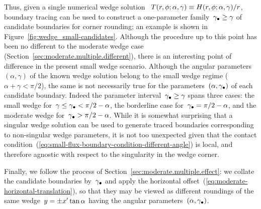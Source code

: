 \begin{figure}
\end{figure}

Thus, given a single numerical wedge solution~%
  $T (r, \phi; \alpha, \gamma) \equiv H (r, \phi; \alpha, \gamma) / r$,
boundary tracing can be used to construct
a one-parameter family~$\gamma_\bullet \ge \gamma$
of candidate boundaries for corner rounding;
an example is shown in Figure~\ref{fig:wedge_small-candidates}.
Although the procedure up to this point
has been no different to the moderate wedge case
(Section~\ref{sec:moderate.multiple.different}),
there is an interesting point of difference
in the present small wedge scenario.
Although the angular parameters~$(\alpha, \gamma)$
of the known wedge solution
belong to the small wedge regime ($\alpha + \gamma < \pi/2$),
the same is not necessarily true
for the parameters~$(\alpha, \gamma_\bullet)$
of each candidate boundary.
Indeed the parameter interval~$\gamma_\bullet \ge \gamma$ spans three cases:
the small wedge for~$\gamma \le \gamma_\bullet < \pi/2 - \alpha$,
the borderline case for~$\gamma_\bullet = \pi/2 - \alpha$,
and the moderate wedge for~$\gamma_\bullet > \pi/2 - \alpha$.
While it is somewhat surprising that a singular wedge solution
can be used to generate traced boundaries corresponding to
non-singular wedge parameters,
it is not too unexpected given that
the contact condition~(\ref{eq:small-flux-boundary-condition-different-angle})
is local,
and therefore agnostic
with respect to the singularity in the wedge corner.

Finally, we follow the process of Section~\ref{sec:moderate.multiple.effect}:
we collate the candidate boundaries by~$\gamma_\bullet$
and apply the horizontal offset~(\ref{eq:moderate-horizontal-translation}),
so that they may be viewed as different roundings
of the same wedge~$y = \pm x' \tan\alpha$
having the angular parameters~$(\alpha, \gamma_\bullet)$.

